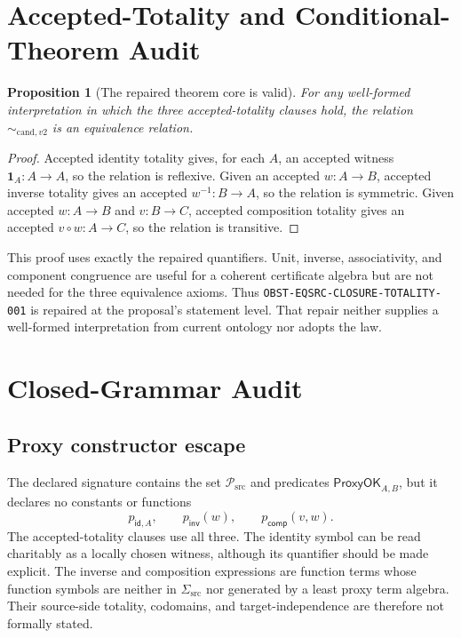 \documentclass[11pt]{article}
\newtheorem{proposition}{Proposition}
\begin{document}
\section{Accepted-Totality and Conditional-Theorem Audit}

\begin{proposition}[The repaired theorem core is valid]
For any well-formed interpretation in which the three accepted-totality
clauses hold, the relation \(\sim_{\mathrm{cand},v2}\) is an equivalence
relation.
\end{proposition}

\begin{proof}
Accepted identity totality gives, for each \(A\), an accepted witness
\(\mathbf 1_A:A\to A\), so the relation is reflexive. Given an accepted
\(w:A\to B\), accepted inverse totality gives an accepted
\(w^{-1}:B\to A\), so the relation is symmetric. Given accepted
\(w:A\to B\) and \(v:B\to C\), accepted composition totality gives an accepted
\(v\circ w:A\to C\), so the relation is transitive.
\end{proof}

This proof uses exactly the repaired quantifiers. Unit, inverse,
associativity, and component congruence are useful for a coherent certificate
algebra but are not needed for the three equivalence axioms. Thus
\texttt{OBST-EQSRC-CLOSURE-TOTALITY-001} is repaired at the proposal's
statement level. That repair neither supplies a well-formed interpretation
from current ontology nor adopts the law.

\section{Closed-Grammar Audit}

\subsection{Proxy constructor escape}

The declared signature contains the set
\(\mathcal P_{\mathrm{src}}\) and predicates
\(\mathsf{ProxyOK}_{A,B}\), but it declares no constants or functions
\[
 p_{\mathsf{id},A},\qquad
 p_{\mathsf{inv}}(w),\qquad
 p_{\mathsf{comp}}(v,w).
\]
The accepted-totality clauses use all three. The identity symbol can be read
charitably as a locally chosen witness, although its quantifier should be made
explicit. The inverse and composition expressions are function terms whose
function symbols are neither in \(\Sigma_{\mathrm{src}}\) nor generated by a
least proxy term algebra. Their source-side totality, codomains, and
target-independence are therefore not formally stated.
\end{document}
